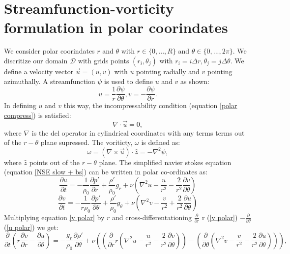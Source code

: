 \documentclass{article}
\begin{document}
\section*{Streamfunction-vorticity formulation in polar coorindates}
We consider polar coorindates $r$ and $\theta$ with $r\in \{ 0, ..., R\}$ and $\theta \in \{ 0, ... , 2\pi\}$. We discritize our domain $\mathcal{D}$ with grids points  $(r_i,\theta_j)$ with $r_i = i \Delta r, \theta_j = j \Delta \theta$. We define a velocity vector $\vec{u} = (u, v)$ with $u$ pointing radially and $v$ pointing azimuthally. A streamfunction $\psi$ is used to define $u$ and $v$ as shown:
\begin{equation}
	u = \frac{1}{r} \frac{\partial \psi}{\partial \theta}, v = - \frac{\partial \psi}{\partial r}.
\end{equation}
In defining $u$ and $v$ this way, the incompressability condition (equation \ref{polar compress}) is satisfied:
\begin{equation}
	\nabla \cdot \vec{u} = 0,
	\label{polar compress}
\end{equation}
where $\nabla$ is the del operator in cylindrical coordinates with any terms terms out of the $r-\theta$ plane supressed. The voriticty, $\omega$ is defined as:
\begin{equation}
	\omega = (\nabla \times \vec{u}) \cdot \hat{z} = - \nabla^2 \psi,
	\label{omega polar}
\end{equation}
where $\hat{z}$ points out of the $r-\theta$ plane.
\newline
The simplified navier stokes equation (equation \ref{NSE slow + bs}) can be written in polar co-ordinates as:
\begin{equation}
	\frac{\partial u}{\partial t} = -\frac{1}{\rho_0} \frac{\partial p'}{\partial r} + \frac{\rho'}{\rho_0} g_r + \nu (  \nabla^2 u - \frac{u}{r^2} - \frac{2}{r^2} \frac{\partial v}{\partial \theta}  )
	\label{u polar}
\end{equation}
\begin{equation}
	\frac{\partial v}{\partial t} = -\frac{1}{r \rho_0} \frac{\partial p'}{\partial \theta} + \frac{\rho'}{\rho_0} g_{\theta} + \nu ( \nabla^2 v - \frac{v}{r^2} + \frac{2}{r^2} \frac{\partial u}{\partial \theta})
	\label{v polar}
\end{equation}
Multiplying equation \ref{v polar} by $r$ and cross-differentationing $\frac{\partial}{\partial r}$ r (\ref{v polar}) $- \frac{\partial}{\partial \theta}$ (\ref{u polar}) we get:
\begin{equation}
	\frac{\partial}{\partial t} (r \frac{\partial v}{\partial r} - \frac{\partial u}{\partial \theta}) = -\frac{g_r}{\rho_0} \frac{\partial \rho'}{\partial \theta} + \nu( (\frac{\partial}{\partial r} r(\nabla^2 u - \frac{u}{r^2} - \frac{2}{r^2} \frac{\partial v}{\partial \theta})) - (\frac{\partial}{\partial \theta} (\nabla^2 v - \frac{v}{r^2} + \frac{2}{r^2} \frac{\partial u}{\partial \theta}) ) ),
	\label{polar 1}
\end{equation}
\end{document}
